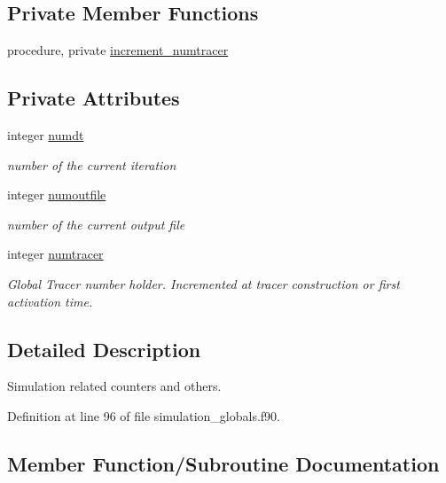 \subsection*{Private Member Functions}
\begin{DoxyCompactItemize}
\item 
procedure, private \mbox{\hyperlink{structsimulation__globals__mod_1_1sim__t_aa7252b8e475986bd90384c6c36ce4242}{increment\+\_\+numtracer}}
\end{DoxyCompactItemize}
\subsection*{Private Attributes}
\begin{DoxyCompactItemize}
\item 
integer \mbox{\hyperlink{structsimulation__globals__mod_1_1sim__t_a6b7422e557c64c2319637600d79dd3cf}{numdt}}
\begin{DoxyCompactList}\small\item\em number of the current iteration \end{DoxyCompactList}\item 
integer \mbox{\hyperlink{structsimulation__globals__mod_1_1sim__t_aab4a954c69a70668421f4071cbc07896}{numoutfile}}
\begin{DoxyCompactList}\small\item\em number of the current output file \end{DoxyCompactList}\item 
integer \mbox{\hyperlink{structsimulation__globals__mod_1_1sim__t_aebab7e606e20096c948d97151a841ff0}{numtracer}}
\begin{DoxyCompactList}\small\item\em Global Tracer number holder. Incremented at tracer construction or first activation time. \end{DoxyCompactList}\end{DoxyCompactItemize}


\subsection{Detailed Description}
Simulation related counters and others. 

Definition at line 96 of file simulation\+\_\+globals.\+f90.



\subsection{Member Function/\+Subroutine Documentation}
\mbox{\label{structsimulation__globals__mod_1_1sim__t_a631b55f5da372943464059c0aef77f09}} 
